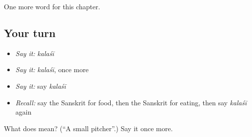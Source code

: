 \begin{grammarlens}[title={What you've built}]
One more word for this chapter.
\end{grammarlens}

\subsection*{Your turn}
\begin{itemize}
\raggedright
  \item \emph{Say it:} \emph{kalaśī}
  \item \emph{Say it:} \emph{kalaśī}, once more
  \item \emph{Say it:} say \emph{kalaśī}
  \item \emph{Recall:} say the Sanskrit for food, then the Sanskrit for eating, then say \emph{kalaśī} again
\end{itemize}

\begin{tcolorbox}[breakable,colback=teal!4,colframe=teal!35!black,title={Before you move on}]
What does  mean? (\textquotedblleft{}A small pitcher\textquotedblright{}.) Say it once more.
\end{tcolorbox}
